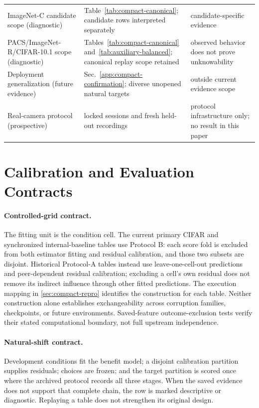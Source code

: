 \begin{table}[!t]
\begin{tabular}{@{}p{}p{}p{}@{}}
ImageNet-C candidate scope (diagnostic) & Table~\ref{tab:compact-canonical}; candidate rows interpreted separately & candidate-specific evidence \\
PACS/ImageNet-R/CIFAR-10.1 scope (diagnostic) & Tables~\ref{tab:compact-canonical} and~\ref{tab:auxiliary-balanced}; canonical replay scope retained & observed behavior does not prove unknowability \\
Deployment generalization (future evidence) & Sec.~\ref{app:compact-confirmation}; diverse unopened natural targets & outside current evidence scope \\
Real-camera protocol (prospective) & locked sessions and fresh held-out recordings & protocol infrastructure only; no result in this paper \\
\bottomrule
\end{tabular}
\end{table}

\section{Calibration and Evaluation Contracts}
\label{app:compact-contracts}

\paragraph{Controlled-grid contract.}
The fitting unit is the condition cell. The current primary CIFAR and synchronized
internal-baseline tables use Protocol B: each score fold is excluded from both
estimator fitting and residual calibration, and those two subsets are disjoint.
Historical Protocol-A tables instead use leave-one-cell-out predictions and
peer-dependent residual calibration; excluding a cell's own residual does not
remove its indirect influence through other fitted predictions. The execution
mapping in \ref{sec:compact-repro} identifies the construction for each table.
Neither construction alone establishes exchangeability across corruption
families, checkpoints, or future environments. Saved-feature outcome-exclusion
tests verify their stated computational boundary, not full upstream independence.

\paragraph{Natural-shift contract.}
Development conditions fit the benefit model; a disjoint calibration partition supplies residuals;
choices are frozen; and the target partition is scored once where the archived protocol records all
three stages. When the saved evidence does not support that complete chain, the row is marked
descriptive or diagnostic. Replaying a table does not strengthen its original design.

